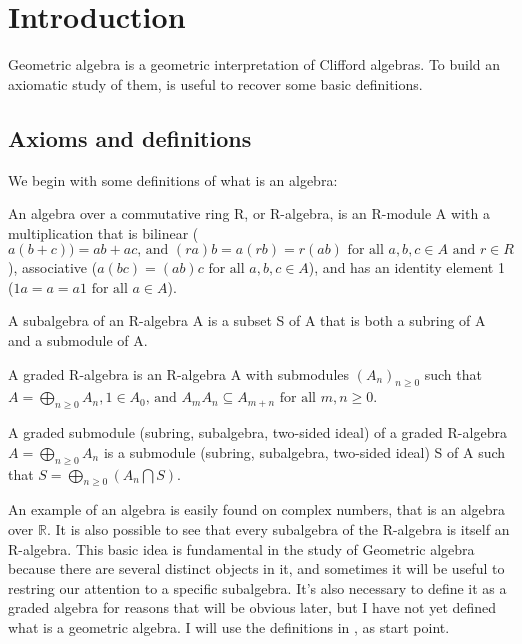 \chapter{Introduction} 
\label{introduction}

Geometric algebra is a geometric interpretation of Clifford algebras. To build an axiomatic study of them, is useful to recover some basic definitions.

\section{Axioms and definitions}

We begin with some definitions\cite{Grillet07} of what is an algebra:

\begin{definition}
An algebra over a commutative ring R, or R-algebra, is an R-module A with a multiplication that is bilinear ($a(b+c))= ab + ac\mbox{, and } (ra) b = a (rb) = r (ab)\mbox{ for all } a, b, c \in A \mbox{ and } r \in R$), associative ($a (bc) = (ab) c \mbox{ for all } a, b, c \in A$), and has an identity element 1 ($1a = a = a1 \mbox{ for all } a \in A$).
\end{definition}

\begin {definition}
A subalgebra of an R-algebra A is a subset S of A that is both a subring of A and a submodule of A.
\end{definition}

\begin{definition}
A graded R-algebra is an R-algebra A with submodules $(A_n)_{n\ge0}$ such that $A = \bigoplus_{n\ge0} A_n , 1 \in A_0 \mbox{, and } A_m A_n \subseteq A_{m+n} \mbox{ for all } m, n \ge 0$.
\end{definition}

\begin{definition}
A graded submodule (subring, subalgebra, two-sided ideal) of a graded R-algebra $A = \bigoplus_{n\ge0} A_n$ is a submodule (subring, subalgebra, two-sided ideal) S of A such that $ S = \bigoplus_{n\ge0} (A_n \bigcap S)$.
\end{definition}

An example of an algebra is easily found on complex numbers, that is an algebra over $\mathbb{R}$. It is also possible to see that every subalgebra of the R-algebra is itself an R-algebra. This basic idea is fundamental in the study of Geometric algebra because there are several distinct objects in it, and sometimes it will be useful to restring our attention to a specific subalgebra. It's also necessary to define it as a graded algebra for reasons that will be obvious later, but I have not yet defined what is a geometric algebra. I will use the definitions in \cite{Chisolm12}, \cite{Kilpatrick14} as start point.

